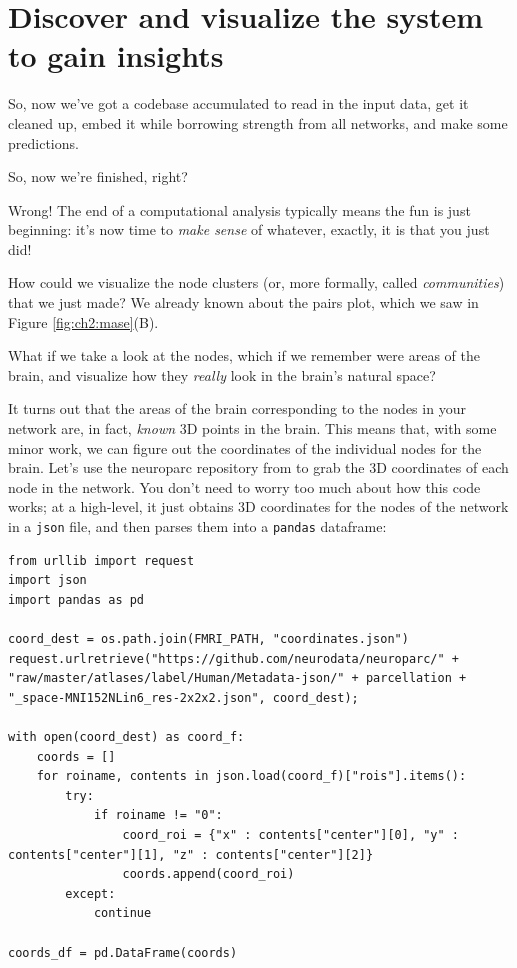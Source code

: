 \section{Discover and visualize the system to gain insights}
\label{sec:ch2:discover}

So, now we've got a codebase accumulated to read in the input data, get it cleaned up, embed it while borrowing strength from all networks, and make some predictions. 

So, now we're finished, right?

Wrong! The end of a computational analysis typically means the fun is just beginning: it's now time to \emph{make sense} of whatever, exactly, it is that you just did!

How could we visualize the node clusters (or, more formally, called \emph{communities}) that we just made? We already known about the pairs plot, which we saw in Figure \ref{fig:ch2:mase}(B). 

What if we take a look at the nodes, which if we remember were areas of the brain, and visualize how they \emph{really} look in the brain's natural space?

It turns out that the areas of the brain corresponding to the nodes in your network are, in fact, \emph{known} 3D points in the brain. This means that, with some minor work, we can figure out the coordinates of the individual nodes for the brain. Let's use the neuroparc repository from \cite{Lawrence2021Mar} to grab the 3D coordinates of each node in the network. You don't need to worry too much about how this code works; at a high-level, it just obtains 3D coordinates for the nodes of the network in a \texttt{json} file, and then parses them into a \texttt{pandas} dataframe:


\begin{lstlisting}[style=python]
from urllib import request
import json
import pandas as pd

coord_dest = os.path.join(FMRI_PATH, "coordinates.json")
request.urlretrieve("https://github.com/neurodata/neuroparc/" + "raw/master/atlases/label/Human/Metadata-json/" + parcellation + "_space-MNI152NLin6_res-2x2x2.json", coord_dest);

with open(coord_dest) as coord_f:
    coords = []
    for roiname, contents in json.load(coord_f)["rois"].items():
        try:
            if roiname != "0":
                coord_roi = {"x" : contents["center"][0], "y" : contents["center"][1], "z" : contents["center"][2]}
                coords.append(coord_roi)
        except:
            continue
            
coords_df = pd.DataFrame(coords)
\end{lstlisting}

